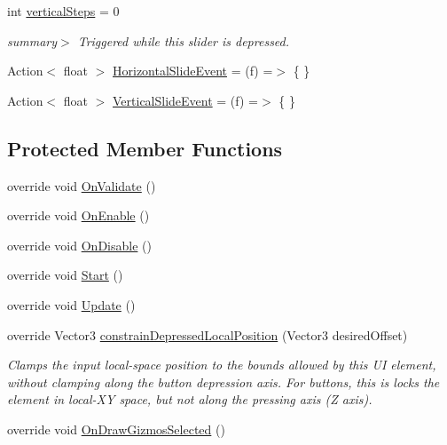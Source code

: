 \begin{DoxyCompactItemize}
\item 
int \mbox{\hyperlink{class_leap_1_1_unity_1_1_interaction_1_1_interaction_slider_a1c480cd9ec1089bfe6084fe6e5b3f52c}{vertical\+Steps}} = 0
\begin{DoxyCompactList}\small\item\em summary$>$ Triggered while this slider is depressed. \end{DoxyCompactList}\item 
Action$<$ float $>$ \mbox{\hyperlink{class_leap_1_1_unity_1_1_interaction_1_1_interaction_slider_a243b45406c68896909172f5293d03cc8}{Horizontal\+Slide\+Event}} = (f) =$>$ \{ \}
\item 
Action$<$ float $>$ \mbox{\hyperlink{class_leap_1_1_unity_1_1_interaction_1_1_interaction_slider_a49c795fc36d6852b16589cfceda0f53c}{Vertical\+Slide\+Event}} = (f) =$>$ \{ \}
\end{DoxyCompactItemize}
\subsection*{Protected Member Functions}
\begin{DoxyCompactItemize}
\item 
override void \mbox{\hyperlink{class_leap_1_1_unity_1_1_interaction_1_1_interaction_slider_a6e91615fa8a4ab9ea1d211b3dcaa0e2b}{On\+Validate}} ()
\item 
override void \mbox{\hyperlink{class_leap_1_1_unity_1_1_interaction_1_1_interaction_slider_a0477f252b1bc1fe7a736b87624a0d951}{On\+Enable}} ()
\item 
override void \mbox{\hyperlink{class_leap_1_1_unity_1_1_interaction_1_1_interaction_slider_ab466b7324c426f9a77797130729ca9a6}{On\+Disable}} ()
\item 
override void \mbox{\hyperlink{class_leap_1_1_unity_1_1_interaction_1_1_interaction_slider_a7a15aed4a6f46dcf1b37ced85386b33b}{Start}} ()
\item 
override void \mbox{\hyperlink{class_leap_1_1_unity_1_1_interaction_1_1_interaction_slider_af07f856388385d64cdd47e6c917308a8}{Update}} ()
\item 
override Vector3 \mbox{\hyperlink{class_leap_1_1_unity_1_1_interaction_1_1_interaction_slider_a8c06bb5258dd92f60e1dd42e65617028}{constrain\+Depressed\+Local\+Position}} (Vector3 desired\+Offset)
\begin{DoxyCompactList}\small\item\em Clamps the input local-\/space position to the bounds allowed by this UI element, without clamping along the button depression axis. For buttons, this is locks the element in local-\/\+XY space, but not along the pressing axis (Z axis). \end{DoxyCompactList}\item 
override void \mbox{\hyperlink{class_leap_1_1_unity_1_1_interaction_1_1_interaction_slider_a231a11f6e3fdd351816de72c016a9b19}{On\+Draw\+Gizmos\+Selected}} ()
\end{DoxyCompactItemize}
